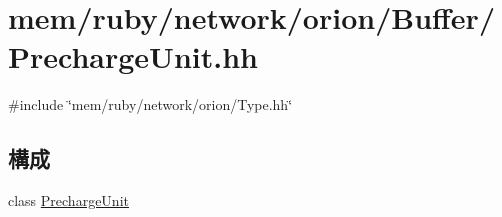 \hypertarget{PrechargeUnit_8hh}{
\section{mem/ruby/network/orion/Buffer/PrechargeUnit.hh}
\label{PrechargeUnit_8hh}
}
{\ttfamily \#include \char`\"{}mem/ruby/network/orion/Type.hh\char`\"{}}\par
\subsection*{構成}
\begin{DoxyCompactItemize}
\item 
class \hyperlink{classPrechargeUnit}{PrechargeUnit}
\end{DoxyCompactItemize}
